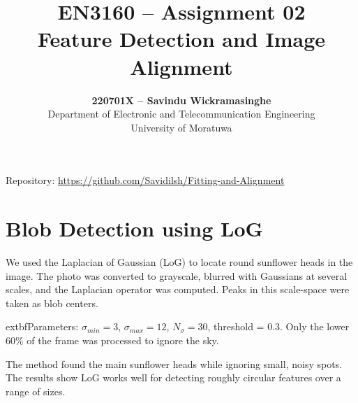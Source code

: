 \documentclass[11pt,a4paper]{article}
\title{\textbf{EN3160 – Assignment 02}\\Feature Detection and Image Alignment}
\author{\textbf{220701X – Savindu Wickramasinghe}\\Department of Electronic and Telecommunication Engineering\\University of Moratuwa}
\date{}
\begin{document}
\maketitle
\vspace{-8mm}
\tableofcontents
\vspace{4mm}
\begin{center}
{\small Repository: \href{https://github.com/Savidilsh/Fitting-and-Alignment}{\url{https://github.com/Savidilsh/Fitting-and-Alignment}}}
\end{center}

\section{Blob Detection using LoG}
We used the Laplacian of Gaussian (LoG) to locate round sunflower heads in the image. The photo was converted to grayscale, blurred with Gaussians at several scales, and the Laplacian operator was computed. Peaks in this scale-space were taken as blob centers.

	extbf{Parameters:} $\sigma_{min}=3$, $\sigma_{max}=12$, $N_\sigma=30$, threshold = 0.3. Only the lower 60\% of the frame was processed to ignore the sky.

The method found the main sunflower heads while ignoring small, noisy spots. The results show LoG works well for detecting roughly circular features over a range of sizes.
\end{document}
